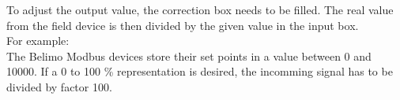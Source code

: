 \documentclass[10pt,letterpaper]{article}
\begin{document}
	To adjust the output value, the correction box needs to be filled.
	The real value from the field device is then divided by the given value in the input box. \\
	For example:\\
	The Belimo Modbus devices store their set points in a value between 0 and 10000. If a 0 to 100 \% representation is desired, the incomming signal has to be divided by factor 100. 
\end{document}
